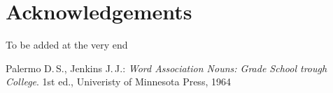 \documentclass[10pt]{article}
\begin{document}
\section{Acknowledgements}

To be added at the very end 



\begin{thebibliography}{99}

Palermo D.\,S., Jenkins J.\,J.:
\emph{Word Association Nouns: Grade School trough College}. 1st ed.,
Univeristy of Minnesota Press, 1964


\end{thebibliography}
\end{document}
